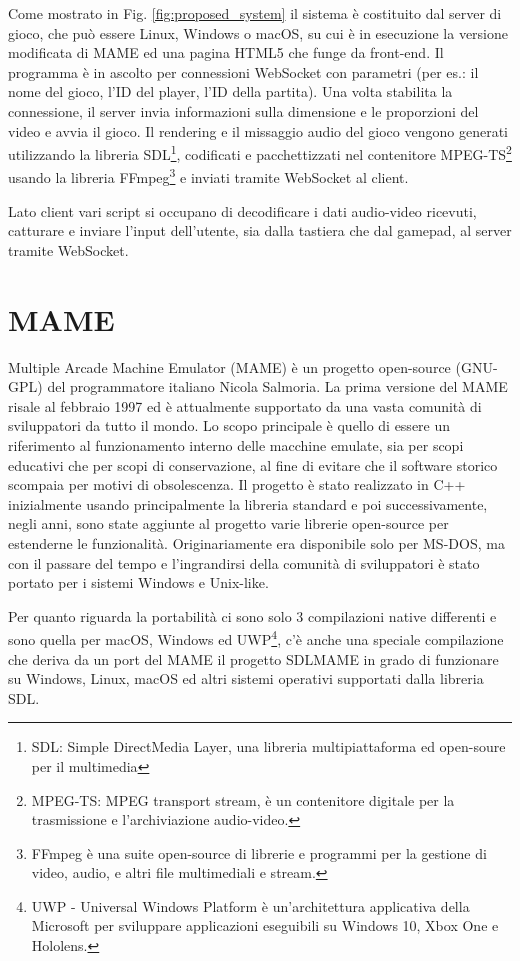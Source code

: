 Come mostrato in Fig. \ref{fig:proposed_system} il sistema è costituito dal server di gioco, che può essere Linux, Windows o macOS, su cui è in esecuzione la versione modificata di MAME ed una pagina HTML5 che funge da front-end. Il programma è in ascolto per connessioni WebSocket con parametri (per es.: il nome del gioco, l'ID del player, l'ID della partita). Una volta stabilita la connessione, il server invia informazioni sulla dimensione e le proporzioni del video e avvia il gioco. Il rendering e il missaggio audio del gioco vengono generati utilizzando la libreria SDL\footnote{SDL: Simple DirectMedia Layer, una libreria multipiattaforma ed open-soure per il multimedia}, codificati e pacchettizzati nel contenitore MPEG-TS\footnote{MPEG-TS: MPEG transport stream, è un contenitore digitale per la trasmissione e l'archiviazione audio-video.} usando la libreria FFmpeg\footnote{FFmpeg è una suite open-source di librerie e programmi per la gestione di video, audio, e altri file multimediali e stream.} e inviati tramite WebSocket al client.

Lato client vari script si occupano di decodificare i dati audio-video ricevuti, catturare e inviare l'input dell'utente, sia dalla tastiera che dal gamepad, al server tramite WebSocket.



\section{MAME}
Multiple Arcade Machine Emulator (MAME) è un progetto open-source (GNU-GPL) del programmatore italiano Nicola Salmoria. La prima versione del MAME risale al febbraio 1997 ed è attualmente supportato da una vasta comunità di sviluppatori da tutto il mondo. Lo scopo principale è quello di essere un riferimento al funzionamento interno delle macchine emulate, sia per scopi educativi che per scopi di conservazione, al fine di evitare che il software storico scompaia per motivi di obsolescenza. Il progetto è stato realizzato in C++ inizialmente usando principalmente la libreria standard e poi successivamente, negli anni, sono state aggiunte al progetto varie librerie open-source per estenderne le funzionalità. Originariamente era disponibile solo per MS-DOS, ma con il passare del tempo e l'ingrandirsi della comunità di sviluppatori è stato portato per i sistemi Windows e Unix-like\cite{MAME}.

Per quanto riguarda la portabilità ci sono solo 3 compilazioni native differenti e sono quella per macOS, Windows ed UWP\footnote{UWP - Universal Windows Platform è un'architettura applicativa della Microsoft per sviluppare applicazioni eseguibili su Windows 10, Xbox One e Hololens.}, c'è anche una speciale compilazione che deriva da un port del MAME il progetto SDLMAME in grado di funzionare su Windows, Linux, macOS ed altri sistemi operativi supportati dalla libreria SDL.

